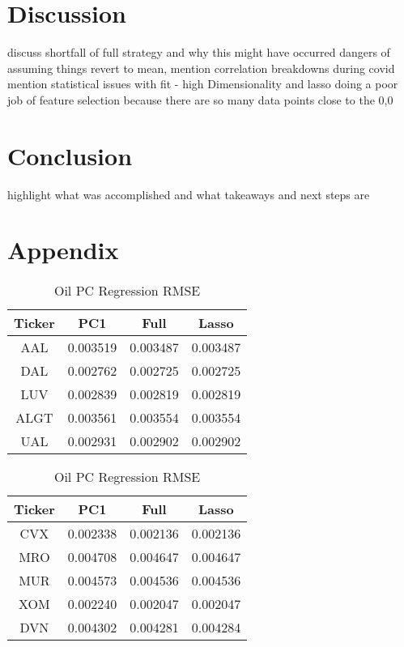 \documentclass{article}
\begin{document}
\section{Discussion}
discuss shortfall of full strategy and why this might have occurred
dangers of assuming things revert to mean, mention correlation breakdowns during
covid
mention statistical issues with fit - high Dimensionality and lasso doing 
a poor job of feature selection because there are so many data points close to the 
0,0

\section{Conclusion}
highlight what was accomplished and what takeaways and next steps are

\newpage
\section{Appendix}

\begin{table}[!htb]
    \begin{minipage}{.5\linewidth}
      \caption{Airline PC Regression RMSE}
      \centering
      \begin{tabular}{ c|c|c|c }
        \textbf{Ticker} & \textbf{PC1} & \textbf{Full} & \textbf{Lasso} \\
        \hline
        AAL	& 0.003519 & 0.003487 & 0.003487\\
        DAL	& 0.002762 & 0.002725 & 0.002725\\
        LUV	& 0.002839 & 0.002819 & 0.002819\\
        ALGT & 0.003561 & 0.003554 & 0.003554\\
        UAL	& 0.002931 & 0.002902 & 0.002902\\
        \end{tabular}
    \end{minipage}%
    \begin{minipage}{.5\linewidth}
      \centering
        \caption{Oil PC Regression RMSE}
        \begin{tabular}{ c|c|c|c  }
            \textbf{Ticker} & \textbf{PC1} & \textbf{Full} & \textbf{Lasso} \\
            \hline
            CVX	& 0.002338	& 0.002136	& 0.002136\\
            MRO	& 0.004708	& 0.004647	& 0.004647\\
            MUR	& 0.004573	& 0.004536	& 0.004536\\
            XOM	& 0.002240	& 0.002047	& 0.002047\\
            DVN	& 0.004302	& 0.004281	& 0.004284\\
        \end{tabular}
    \end{minipage} 
\end{table}
\end{document}
